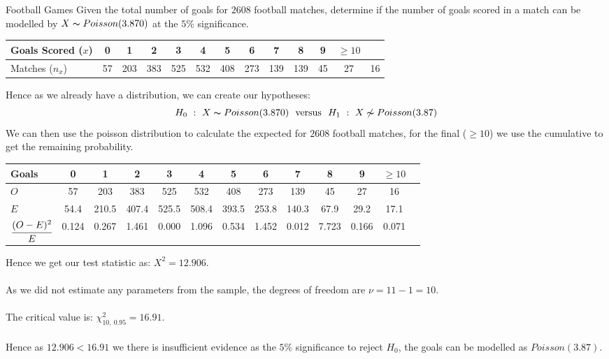 \begin{examplebox}{Football Games}
Given the total number of goals for $2608$ football matches, determine if the number of goals scored in a match can be modelled by $X \thicksim Poisson(3.870)$ at the $5\%$ significance.
\begin{center}
	\begin{tabular}{l | c c c c c c c c c c c c}
		Goals Scored ($x$) & 0  & 1   & 2   & 3   & 4   & 5   & 6   & 7   & 8   & 9  & $\geq 10$      \\
		\hline
		Matches ($n_x$)    & 57 & 203 & 383 & 525 & 532 & 408 & 273 & 139 & 139 & 45 & 27        & 16 \\
	\end{tabular}
\end{center}
Hence as we already have a distribution, we can create our hypotheses:
\[H_0 \ : \ X \thicksim Poisson(3.870) \ \text{  versus  } \ H_1 \ : \ X \not\thicksim Poisson(3.87)\]
We can then use the poisson distribution to calculate the expected for $2608$ football matches, for the final ($\geq 10$) we use the cumulative to get the remaining probability.
\begin{center}
	\begin{tabular}{l | c c c c c c c c c c c c}
		Goals                  & 0     & 1     & 2     & 3     & 4     & 5     & 6     & 7     & 8     & 9     & $\geq 10$ \\
		\hline
		$O$                    & 57    & 203   & 383   & 525   & 532   & 408   & 273   & 139   & 45    & 27    & 16        \\
		$E$                    & 54.4  & 210.5 & 407.4 & 525.5 & 508.4 & 393.5 & 253.8 & 140.3 & 67.9  & 29.2  & 17.1      \\
		$\cfrac{(O - E)^2}{E}$ & 0.124 & 0.267 & 1.461 & 0.000 & 1.096 & 0.534 & 1.452 & 0.012 & 7.723 & 0.166 & 0.071     \\
	\end{tabular}
\end{center}
Hence we get our test statistic as: $X^2 = 12.906$.
\\
\\ As we did not estimate any parameters from the sample, the degrees of freedom are $\nu = 11 - 1 = 10$.
\\
\\ The critical value is: $\chi^2_{10, \ 0.95} = 16.91$.
\\
\\ Hence as $12.906 < 16.91$ we there is insufficient evidence as the $5\%$ significance to reject $H_0$, the goals can be modelled as $Poisson(3.87)$.
\end{examplebox}
